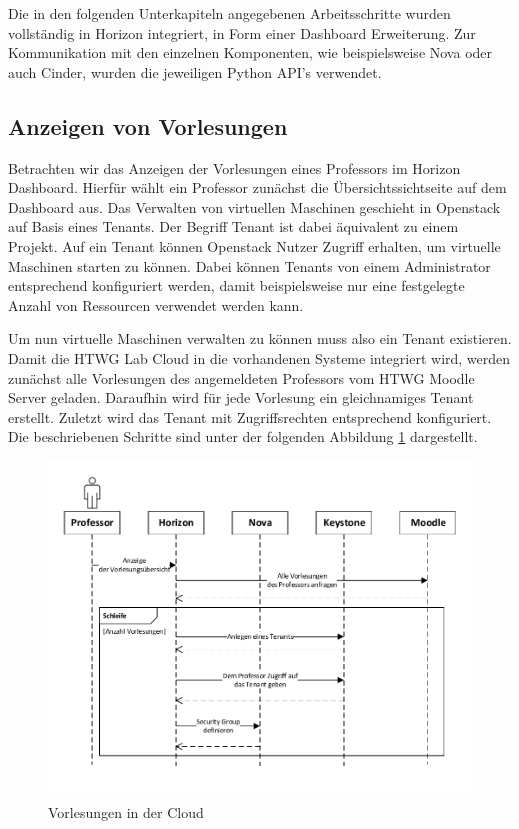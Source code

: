 Die in den folgenden Unterkapiteln angegebenen Arbeitsschritte wurden vollständig in Horizon
integriert, in Form einer Dashboard Erweiterung.
Zur Kommunikation mit den einzelnen Komponenten, wie beispielsweise Nova oder auch Cinder, wurden
die jeweiligen Python API's verwendet.



\newpage
\subsection{Anzeigen von Vorlesungen}
Betrachten wir das Anzeigen der Vorlesungen eines Professors im Horizon Dashboard.
Hierfür wählt ein Professor zunächst die Übersichtssichtseite auf dem Dashboard aus.
Das Verwalten von virtuellen Maschinen geschieht in Openstack auf Basis eines
Tenants. Der Begriff Tenant ist dabei äquivalent zu einem Projekt. 
Auf ein Tenant können Openstack Nutzer Zugriff erhalten, um virtuelle Maschinen starten
zu können. Dabei können Tenants von einem Administrator entsprechend konfiguriert werden, damit
beispielsweise nur eine festgelegte Anzahl von Ressourcen verwendet werden kann.

Um nun virtuelle Maschinen verwalten zu können muss also ein Tenant existieren.
Damit die HTWG Lab Cloud in die vorhandenen Systeme integriert wird, werden zunächst
alle Vorlesungen des angemeldeten Professors vom HTWG Moodle Server geladen.
Daraufhin wird für jede Vorlesung ein gleichnamiges Tenant erstellt. Zuletzt wird das Tenant
mit Zugriffsrechten entsprechend konfiguriert. Die beschriebenen Schritte sind unter der folgenden
Abbildung \ref{createTenants} dargestellt.

\begin{figure}[H]
	\centering
	\includegraphics[scale=0.7]{img/createTenants.pdf}
\caption{Vorlesungen in der Cloud}
\label{createTenants}
\FloatBarrier
\end{figure}


